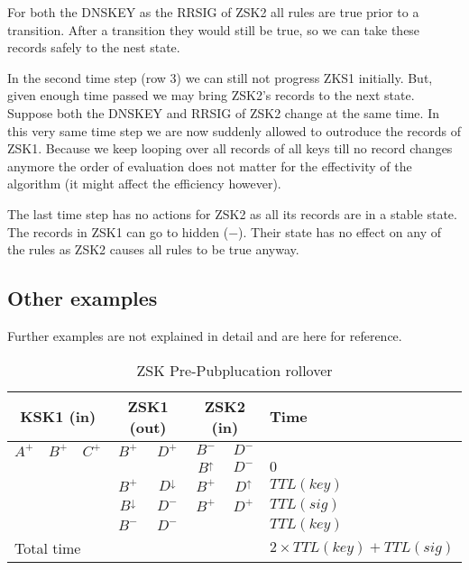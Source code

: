 \documentclass[twoside, a4paper]{article}
\begin{document}
For both the DNSKEY as the RRSIG of ZSK2 all rules are true prior to 
a transition. After a transition they would still be true, so we can 
take these records safely to the nest state.

In the second time step (row 3) we can still not progress ZKS1 
initially. But, given enough time passed we may bring ZSK2's records 
to the next state. Suppose both the DNSKEY and RRSIG of ZSK2 change 
at the same time. In this very same time step we are now suddenly 
allowed to outroduce the records of ZSK1. Because we keep looping 
over all records of all keys till no record changes anymore the 
order of evaluation does not matter for the effectivity of the 
algorithm (it might affect the efficiency however).

The last time step has no actions for ZSK2 as all its records are in a stable
state. The records in ZSK1 can go to hidden ($-$). Their state has no effect
on any of the rules as ZSK2 causes all rules to be true anyway.

\subsection{Other examples}

Further examples are not explained in detail and are here for reference.

\begin{table}[h]
\centering
\begin{tabular}{ |ccc|cc|cc|l| }
\hline
\multicolumn{3}{|c|}{KSK1 (in)} & \multicolumn{2}{c|}{ZSK1 (out)} & \multicolumn{2}{c|}{ZSK2 (in)} & Time\\
\hline
$A^{+}$ & $B^{+}$ & $C^{+}$ & $B^{+}$          & $D^{+}$          & $B^{-}$        & $D^{-}$        & \\
        &         &         &                  &                  & $B^{\uparrow}$ & $D^{-}$        & $0$\\
        &         &         & $B^{+}$          & $D^{\downarrow}$ & $B^{+}$        & $D^{\uparrow}$ & $TTL(key)$\\
        &         &         & $B^{\downarrow}$ & $D^{-}$          & $B^{+}$        & $D^{+}$        & $TTL(sig)$\\
        &         &         & $B^{-}$          & $D^{-}$          &                &                & $TTL(key)$\\
\hline
\multicolumn{7}{|l|}{Total time} & $2 \times TTL(key) + TTL(sig)$\\
\hline
\end{tabular}
\caption{ZSK Pre-Pubplucation rollover}
\label{tab:roll_prepub}
\end{table}
\end{document}
